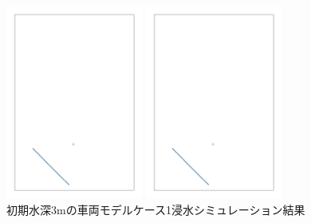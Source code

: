 \documentclass[12pt]{jsarticle}
\begin{document}
\begin{figure}[H]
\begin{center}
    \begin{minipage}[b]{0.45\linewidth}
      \centering
      \includegraphics[width=4.5cm]{images/diag_car_init.png}
    \end{minipage}
    \begin{minipage}[b]{0.45\linewidth}
      \centering
      \includegraphics[width=4.5cm]{images/diag_car_init.png}
    \end{minipage}
    \end{center}
    \caption{初期水深3mの車両モデルケース1浸水シミュレーション結果}
    \label{fig:car_case1_3m}
  \end{figure}
\end{document}
